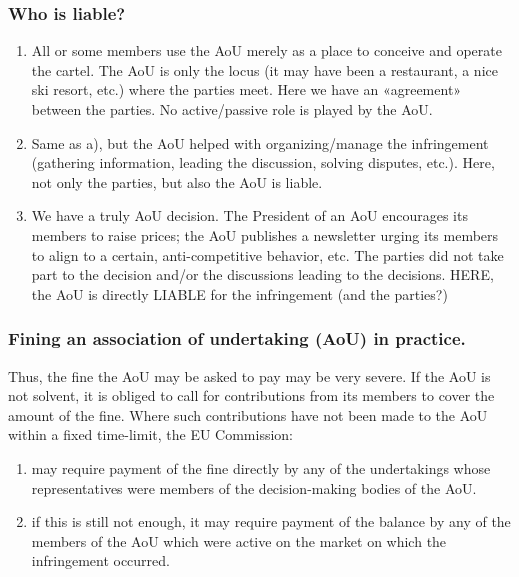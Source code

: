         \subsubsection{Who is liable?}

            \begin{enumerate}
                \item All or some members use the AoU merely as a place to conceive and operate the cartel. The AoU is only the locus (it may have been a restaurant, a nice ski resort, etc.) where the parties meet. Here we have an «agreement» between the parties. No active/passive role is played by the AoU. 
                \item Same as a), but the AoU helped with organizing/manage the infringement (gathering information, leading the discussion, solving disputes, etc.). Here, not only the parties, but also the AoU is liable. 
                \item We have a truly AoU decision. The President of an AoU encourages its members to raise prices; the AoU publishes a newsletter urging its members to align to a certain, anti-competitive behavior, etc. The parties did not take part to the decision and/or the discussions leading to the decisions. HERE, the AoU is directly LIABLE for the infringement (and the parties?)
            \end{enumerate}


        \subsubsection{Fining an association of undertaking (AoU) in practice.}

            Thus, the fine the AoU may be asked to pay may be very severe. If the AoU is not solvent, it is obliged to call for contributions from its members to cover the amount of the fine. Where such contributions have not been made to the AoU within a fixed time-limit, the EU Commission:

            \begin{enumerate}
                \item may require payment of the fine directly by any of the undertakings whose representatives were members of the decision-making bodies of the AoU. 
                \item if this is still not enough, it may require payment of the balance by any of the members of the AoU which were active on the market on which the infringement occurred.
            \end{enumerate}

